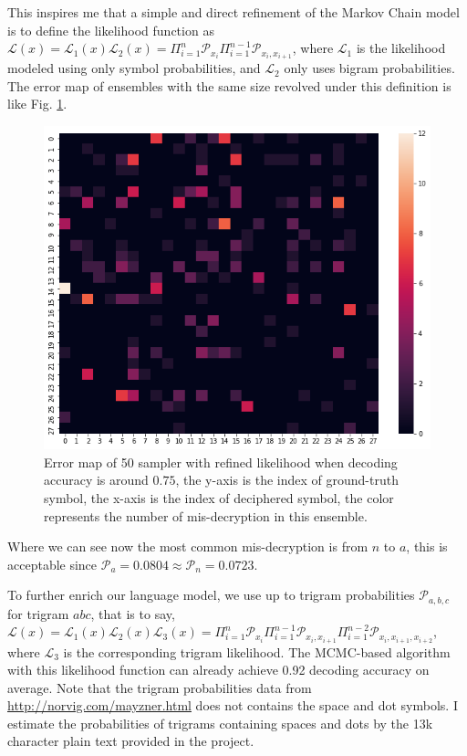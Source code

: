 \documentclass[10pt, twocolumn]{article}
\begin{document}
This inspires me that a simple and direct refinement of the Markov Chain model is to define the likelihood function as $\mathcal{L}(x) = \mathcal{L}_1(x)\mathcal{L}_2(x) = \Pi_{i=1}^{n}\mathcal{P}_{x_i}\Pi_{i=1}^{n-1}\mathcal{P}_{x_i, x_{i+1}}$, where $\mathcal{L}_1$ is the likelihood modeled using only symbol probabilities, and $\mathcal{L}_2$ only uses bigram probabilities. The error map of ensembles with the same size revolved under this definition is like Fig. \ref{fig:error_map_refined}.
\begin{figure}[t]
	\centering
	\includegraphics[width=0.9\linewidth]{pics/error_map_refined.png}
	\caption{Error map of 50 sampler with refined likelihood when decoding accuracy is around $0.75$, the y-axis is the index of ground-truth symbol, the x-axis is the index of deciphered symbol, the color represents the number of mis-decryption in this ensemble.}
	\label{fig:error_map_refined}
\end{figure}
Where we can see now the most common mis-decryption is from $n$ to $a$, this is acceptable since $\mathcal{P}_{a}=0.0804\approx\mathcal{P}_{n}=0.0723$.

To further enrich our language model, we use up to trigram probabilities $\mathcal{P}_{a,b,c}$ for trigram $abc$, that is to say, $\mathcal{L}(x) = \mathcal{L}_1(x)\mathcal{L}_2(x)\mathcal{L}_3(x) = \Pi_{i=1}^{n}\mathcal{P}_{x_i}\Pi_{i=1}^{n-1}\mathcal{P}_{x_i, x_{i+1}}\Pi_{i=1}^{n-2}\mathcal{P}_{x_i, x_{i+1}, x_{i+2}}$, where $\mathcal{L}_3$ is the corresponding trigram likelihood. The MCMC-based algorithm with this likelihood function can already achieve 0.92 decoding accuracy on average. Note that the trigram probabilities data from \url{http://norvig.com/mayzner.html} does not contains the space and dot symbols. I estimate the probabilities of trigrams containing spaces and dots by the 13k character plain text provided in the project.
\end{document}
